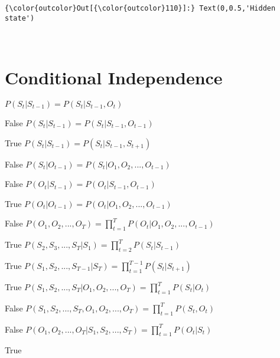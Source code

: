 \documentclass[11]{article}
\begin{document}
\begin{Verbatim}[commandchars=\\\{\}]
{\color{outcolor}Out[{\color{outcolor}110}]:} Text(0,0.5,'Hidden state')
\end{Verbatim}
            
    \begin{center}
    \end{center}
    { \hspace*{\fill} \\}
\section{Conditional Independence}

$P(S_t|S_{t-1})=P(S_t|S_{t-1},O_t)$

False
\linebreak
$P(S_t|S_{t-1})=P(S_t|S_{t-1},O_{t-1})$

True
\linebreak
$P(S_t|S_{t-1})=P(S_t|S_{t-1},S_{t+1})$

False
\linebreak
$P(S_t|O_{t-1})=P(S_t|O_1,O_2,...,O_{t-1})$

False
\linebreak
$P(O_t|S_{t-1})=P(O_t|S_{t-1},O_{t-1})$

True
\linebreak
$P(O_t|O_{t-1})=P(O_t|O_1,O_2,...,O_{t-1})$

False
\linebreak
$P(O_1,O_2,...,O_T)=\prod_{t=1}^T P(O_t|O_1,O_2,...,O_{t-1})$

True
\linebreak
$P(S_2,S_3,...,S_T|S_1)=\prod_{t=2}^T P(S_t|S_{t-1})$

True
\linebreak
$P(S_1,S_2,...,S_{T-1}|S_T)=\prod_{t=1}^{T-1} P(S_t|S_{t+1})$

True
\linebreak
$P(S_1,S_2,...,S_T|O_1,O_2,...,O_T)=\prod_{t=1}^T P(S_t|O_t)$

False
\linebreak
$P(S_1,S_2,...,S_T,O_1,O_2,...,O_T)=\prod_{t=1}^T P(S_t,O_t)$

False
\linebreak
$P(O_1,O_2,...,O_T|S_1,S_2,...,S_T)=\prod_{t=1}^T P(O_t|S_t)$

True
\end{document}
